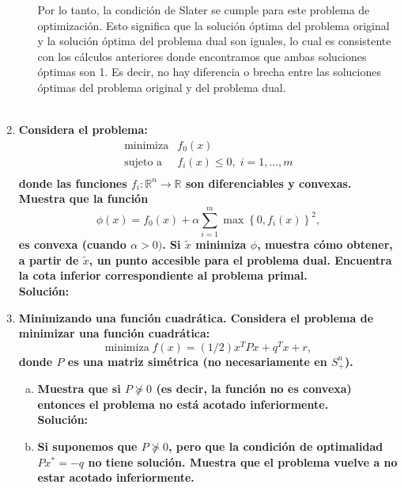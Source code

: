 \begin{enumerate}
\begin{enumerate}[\bfseries (a)]
	    Por lo tanto, la condición de Slater se cumple para este problema de optimización. Esto significa que la solución óptima del problema original y la solución óptima del problema dual son iguales, lo cual es consistente con los cálculos anteriores donde encontramos que ambas soluciones óptimas son 1. Es decir, no hay diferencia o brecha entre las soluciones óptimas del problema original y del problema dual.\\\\


    \end{enumerate}

    \item \textbf{\boldmath Considera el problema:
    $$
    \begin{array}{ll}
	\text{minimiza} & f_0(x)\\
	\text{sujeto a} & f_i(x)\leq 0, \; i=1,\dots,m\\
    \end{array}
    $$
    donde las funciones $f_i:\mathbb{R}^n\to \mathbb{R}$ son diferenciables y convexas. Muestra que la función
    $$\phi(x) = f_0(x)+\alpha \sum_{i=1}^m \max\left\{0,f_i(x)\right\}^2,$$
    es convexa (cuando $\alpha>0)$. Si $\tilde{x}$ minimiza $\phi$, muestra cómo obtener, a partir de $\tilde{x}$, un punto accesible para el problema dual. Encuentra la cota inferior correspondiente al problema primal.}\\

	\textbf{Solución:} 


    \item \textbf{\boldmath Minimizando una función cuadrática. Considera el problema de minimizar una función cuadrática:
    $$\text{minimiza} \; f(x)=(1/2)x^TPx+q^Tx+r,$$
    donde $P$ es una matriz simétrica (no necesariamente en $S^n_{+}$).}\\

    \begin{enumerate}[(a)]

	\item \textbf{\boldmath Muestra que si $P \nsucceq 0$ (es decir, la función no es convexa) entonces el problema no está acotado inferiormente.}\\

	    \textbf{Solución:}

	\item \textbf{\boldmath Si suponemos que $P \nsucceq 0$, pero que la condición de optimalidad $Px^* = -q$ no tiene solución. Muestra que el problema vuelve a no estar acotado inferiormente.}\\


\end{enumerate}
\end{enumerate}
